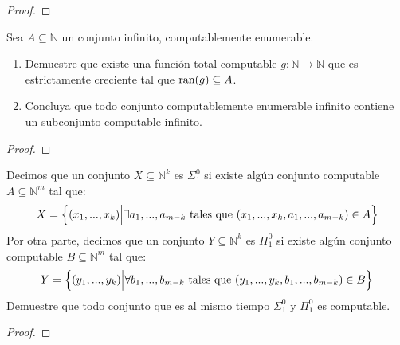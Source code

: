 \documentclass[12pt]{report}
\newcounter{it}
\theoremstyle{largebreak}
\newcommand\cf[3]{\ensuremath{#1:#2\rightarrow#3}}
\begin{document}
    \begin{proof}
        
    \end{proof}

    \begin{excer}
        Sea $A\subseteq\mathbb{N}$ un conjunto infinito, computablemente enumerable.
        \begin{enumerate}[label = \textit{(\alph*)}]
            \item Demuestre que existe una función total computable $\cf{g}{\mathbb{N}}{\mathbb{N}}$ que es estrictamente creciente tal que $\textup{ran}(g)\subseteq A$.
            \item Concluya que todo conjunto computablemente enumerable infinito contiene un subconjunto computable infinito.
        \end{enumerate}
    \end{excer}

    \begin{proof}
        
    \end{proof}

    \begin{excer}
        Decimos que un conjunto $X\subseteq\mathbb{N}^k$ es $\Sigma_1^0$ si existe algún conjunto computable $A\subseteq\mathbb{N}^m$ tal que:
        \begin{equation*}
            X=\left\{(x_1,...,x_k)\Big|\exists a_1,...,a_{ m-k}\textup{ tales que }(x_1,...,x_k,a_1,...,a_{m-k})\in A\right\}
        \end{equation*}
        Por otra parte, decimos que un conjunto $Y\subseteq\mathbb{N}^k$ es $\Pi_1^0$ si existe algún conjunto computable $B\subseteq\mathbb{N}^m$ tal que:
        \begin{equation*}
            Y=\left\{(y_1,...,y_k)\Big|\forall b_1,...,b_{ m-k}\textup{ tales que }(y_1,...,y_k,b_1,...,b_{m-k})\in B\right\}
        \end{equation*}
        Demuestre que todo conjunto que es al mismo tiempo $\Sigma_1^0$ y $\Pi_1^0$ es computable.
    \end{excer}

    \begin{proof}
        
    \end{proof}
\end{document}
